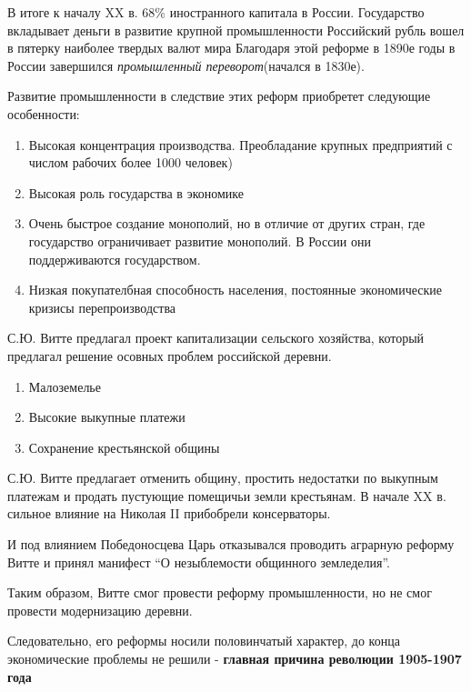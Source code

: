 \documentclass[a4paper]{article}
\begin{document}
В итоге к началу XX в. 68\% иностранного капитала в России.
Государство вкладывает деньги в развитие крупной промышленности
Российский рубль вошел в пятерку наиболее твердых валют мира
Благодаря этой реформе в 1890е годы в России завершился \emph{промышленный переворот}(начался в 1830е).

Развитие промышленности в следствие этих реформ приобретет следующие особенности:

\begin{enumerate}
    \item Высокая концентрация производства. Преобладание крупных предприятий с числом рабочих более 1000 человек)
    \item Высокая роль государства в экономике
    \item Очень быстрое создание монополий, но в отличие от других стран, где государство ограничивает развитие монополий. В России они поддерживаются государством.
    \item Низкая покупателбная способность населения, постоянные экономические кризисы перепроизводства
\end{enumerate}

С.Ю. Витте предлагал проект капитализации сельского хозяйства, который предлагал решение осовных проблем российской деревни.
\begin{enumerate}
    \item Малоземелье
    \item Высокие выкупные платежи
    \item Сохранение крестьянской общины
\end{enumerate}

С.Ю. Витте предлагает отменить общину, простить недостатки по выкупным платежам и продать пустующие помещичьи земли крестьянам. В начале XX в. сильное влияние на Николая II прибобрели консерваторы.

И под влиянием Победоносцева Царь отказывался проводить аграрную реформу Витте и принял манифест ``О незыблемости общинного земледелия''.

Таким образом, Витте смог провести реформу промышленности, но не смог провести модернизацию деревни.

Следовательно, его реформы носили половинчатый характер, до конца экономические проблемы не решили - \textbf{главная причина революции 1905-1907 года}
\end{document}
